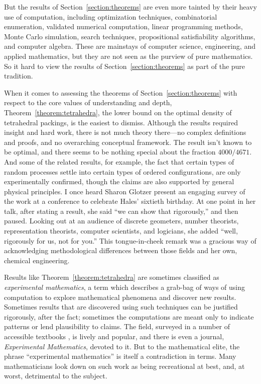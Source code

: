 \documentclass[12pt]{amsart}
\theoremstyle{definition}
\theoremstyle{remark}
\numberwithin{equation}{section}
\begin{document}
But the results of Section~\ref{section:theorems} are even more tainted by their heavy use of computation, including optimization techniques, combinatorial enumeration, validated numerical computation, linear programming methods, Monte Carlo simulation, search techniques, propositional satisfiability algorithms, and computer algebra. These are mainstays of computer science, engineering, and applied mathematics, but they are not seen as the purview of pure mathematics. So it hard to view the results of Section~\ref{section:theorems} as part of the pure tradition.

When it comes to assessing the theorems of Section~\ref{section:theorems} with respect to the core values of understanding and depth, Theorem~\ref{theorem:tetrahedra}, the lower bound on the optimal density of tetrahedral packings, is the easiest to dismiss. Although the results required insight and hard work, there is not much theory there---no complex definitions and proofs, and no overarching conceptual framework. The result isn't known to be optimal, and there seems to be nothing special about the fraction $4000/4671$. And some of the related results, for example, the fact that certain types of random processes settle into certain types of ordered configurations, are only experimentally confirmed, though the claims are also supported by general physical principles. I once heard Sharon Glotzer present an engaging survey of the work at a conference to celebrate Hales' sixtieth birthday. At one point in her talk, after stating a result, she said ``we can show that rigorously,'' and then paused. Looking out at an audience of discrete geometers, number theorists, representation theorists, computer scientists, and logicians, she added ``well, rigorously for us, not for you.'' This tongue-in-cheek remark was a gracious way of acknowledging methodological differences between those fields and her own, chemical engineering.

Results like Theorem~\ref{theorem:tetrahedra} are sometimes classified as \emph{experimental mathematics}, a term which describes a grab-bag of ways of using computation to explore mathematical phenomena and discover new results. Sometimes results that are discovered using such techniques can be justified rigorously, after the fact; sometimes the computations are meant only to indicate patterns or lend plausibility to claims. The field, surveyed in a number of accessible textbooks \cite{borwein:bailey:08,borwein:devlin:09}, is lively and popular, and there is even a journal, \emph{Experimental Mathematics}, devoted to it. But to the mathematical elite, the phrase ``experimental mathematics'' is itself a contradiction in terms. Many mathematicians look down on such work as being recreational at best, and, at worst, detrimental to the subject.
\end{document}

